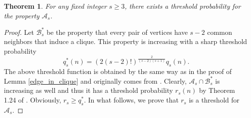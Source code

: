 \documentclass[hidelinks, 11pt]{article}
\theoremstyle{plain}
\newtheorem{theorem}{Theorem}[section]
\theoremstyle{definition}
\begin{document}
\begin{theorem}\label{lower-i}
For any   fixed integer  $s\geq 3$, there exists a threshold probability for the property   $\mathcal{A}_s$.
\end{theorem}



\begin{proof}
Let  $\mathcal{B}^*_s$ be  the   property that every pair of vertices have   $s-2$ common neighbors that induce a clique. This property is   increasing  with  a    sharp threshold probability  $$q^*_s(n)=(2(s-2)!)^{\frac{2}{(s-2)(s+1)}}q_s(n).$$ The above  threshold  function   is  obtained by    the  same way as in the proof of Lemma \ref{edge_in_clique} and  originally comes from   \cite{SP90}. Clearly, $\mathcal{A}_s\cap\mathcal{B}^*_s$ is increasing as well and thus  it has a threshold probability $r_s(n)$ by Theorem 1.24 of  \cite{RG}. Obviously,  $r_s\geq q^*_s$.
In what follows, we prove that   $r_s$ is a threshold for $\mathcal{A}_s$.



\end{proof}
\end{document}
